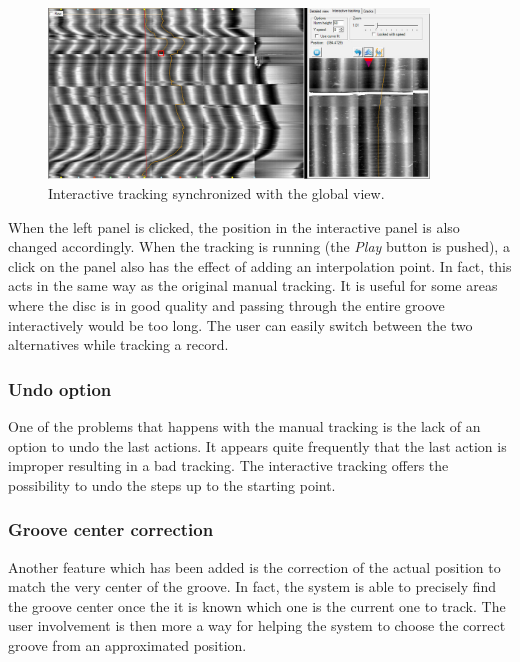 \begin{figure}[!ht]
\centering
\includegraphics[width=0.9\textwidth]{images/int-track-sync}
\caption{Interactive tracking synchronized with the global view.}
\label{fig:intsynctrack}
\end{figure}

When the left panel is clicked, the position in the interactive panel is also changed accordingly. When the tracking is running (the \emph{Play} button is pushed), a click on the panel also has the effect of adding an interpolation point. In fact, this acts in the same way as the original manual tracking. It is useful for some areas where the disc is in good quality and passing through the entire groove interactively would be too long. The user can easily switch between the two alternatives while tracking a record.

\subsubsection{Undo option}

One of the problems that happens with the manual tracking is the lack of an option to undo the last actions. It appears quite frequently that the last action is improper resulting in a bad tracking. The interactive tracking offers the possibility to undo the steps up to the starting point.

\subsubsection{Groove center correction}

Another feature which has been added is the correction of the actual position to match the very center of the groove. In fact, the system is able to precisely find the groove center once the it is known which one is the current one to track. The user involvement is then more a way for helping the system to choose the correct groove from an approximated position.

